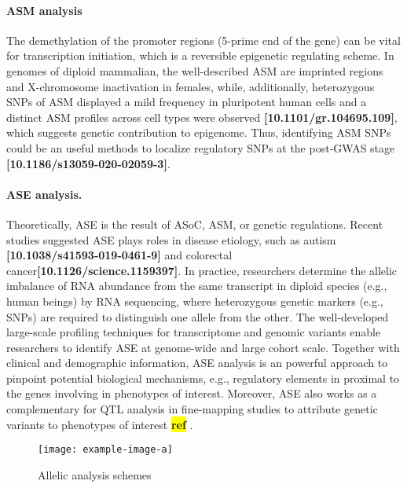 \documentclass[12pt,usletter,fancy]{elegantbook}
\newcommand{\reqref}[1][ref]{
  \colorbox{yellow}{\textbf{#1}}
}
\begin{document}
\paragraph*{ASM analysis}
The demethylation of the promoter regions (5-prime end of the gene) can be vital for transcription initiation, which is a reversible epigenetic regulating scheme.
In genomes of diploid mammalian, the well-described ASM are imprinted regions and X-chromosome inactivation in females, while, additionally, heterozygous SNPs of ASM displayed a mild frequency in pluripotent human cells and a distinct ASM profiles across cell types were observed \textbf{[10.1101/gr.104695.109]}, which suggests genetic contribution to epigenome.
Thus, identifying ASM SNPs could be an useful methods to localize regulatory SNPs at the post-GWAS stage \textbf{[10.1186/s13059-020-02059-3]}.

\paragraph*{ASE analysis.}
Theoretically, ASE is the result of ASoC, ASM, or genetic regulations.
Recent studies suggested ASE plays roles in disease etiology, such as autism \textbf{[10.1038/s41593-019-0461-9]} and colorectal cancer\textbf{[10.1126/science.1159397]}.
In practice, researchers determine the allelic imbalance of RNA abundance from the same transcript in diploid species (e.g., human beings) by RNA sequencing, where heterozygous genetic markers (e.g., SNPs) are required to distinguish one allele from the other.
The well-developed large-scale profiling techniques for transcriptome and genomic variants enable researchers to identify ASE at genome-wide and large cohort scale.
Together with clinical and demographic information, ASE analysis is an powerful approach to pinpoint potential biological mechanisms, e.g., regulatory elements in proximal to the genes involving in phenotypes of interest.
Moreover, ASE also works as a complementary for QTL analysis in fine-mapping studies to attribute genetic variants to phenotypes of interest\reqref.

\begin{figure}[h]
  \centering
  \texttt{[image: example-image-a]}
  \vspace*{0.2cm}
  \caption{Allelic analysis schemes}
  \label{fig:example-image-a}
\end{figure}
\end{document}
